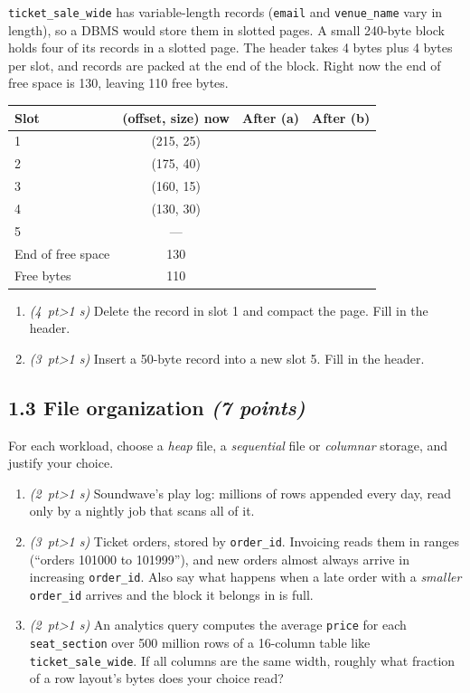 \documentclass[11pt]{article}
\newcommand{\code}[1]{\texttt{#1}}
\newcommand{\pts}[1]{\hfill\textit{(#1 points)}}
\newcommand{\pt}[1]{\textit{(#1~pt\ifnum#1>1 s\fi)}}
\begin{document}
\code{ticket\_sale\_wide} has variable-length records (\code{email} and
\code{venue\_name} vary in length), so a DBMS would store them in slotted
pages. A small 240-byte block holds four of its records in a slotted page. The
header takes 4 bytes plus 4 bytes per slot, and records are packed at the end
of the block. Right now the end of free space is 130, leaving 110 free bytes.

\begin{center}
\small
\begin{tabular}{@{}lccc@{}}
\toprule
\textbf{Slot} & \textbf{(offset, size) now} & \textbf{After (a)} & \textbf{After (b)}\\
\midrule
1 & (215, 25) & & \\
2 & (175, 40) & & \\
3 & (160, 15) & & \\
4 & (130, 30) & & \\
5 & --- & & \\
\midrule
End of free space & 130 & & \\
Free bytes & 110 & & \\
\bottomrule
\end{tabular}
\end{center}

\begin{enumerate}[label=(\alph*)]
  \item \pt{4} Delete the record in slot 1 and compact the page. Fill in the
  header.

  \item \pt{3} Insert a 50-byte record into a new slot 5. Fill in the header.
\end{enumerate}

\subsection*{1.3 File organization \pts{7}}

For each workload, choose a \emph{heap} file, a \emph{sequential} file or
\emph{columnar} storage, and justify your choice.

\begin{enumerate}[label=(\alph*)]
  \item \pt{2} Soundwave's play log: millions of rows appended every day, read
  only by a nightly job that scans all of it.

  \item \pt{3} Ticket orders, stored by \code{order\_id}. Invoicing reads
  them in ranges (``orders 101000 to 101999''), and new orders almost always
  arrive in increasing \code{order\_id}. Also say what happens when a late
  order with a \emph{smaller} \code{order\_id} arrives and the block it
  belongs in is full.

  \item \pt{2} An analytics query computes the average \code{price} for each
  \code{seat\_section} over 500 million rows of a 16-column table like
  \code{ticket\_sale\_wide}. If all columns are the same width, roughly what
  fraction of a row layout's bytes does your choice read?
\end{enumerate}
\end{document}
